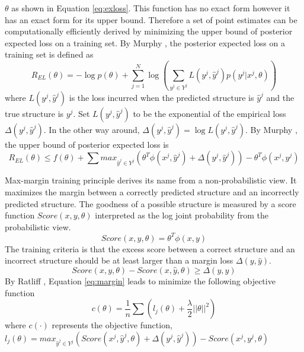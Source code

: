 $\theta$ as shown in Equation \ref{eq:exloss}. This function has no exact form however it has an exact form for its upper bound. Therefore a set of point estimates can be computationally efficiently derived by minimizing the upper bound of posterior expected loss on a training set. By Murphy \cite{murphy2012machine}, the posterior expected loss on a training set is defined as
\begin{equation}
\label{eq:exloss}
R_{EL}(\theta)=-\log p(\theta)+\sum_{j=1}^N \log(\sum_{y^j\in Y^j}L(y^j,\hat{y}^j)p(y^j|x^j,\theta))
\end{equation}
where $L(y^j,\hat{y}^j)$ is the loss incurred when the predicted structure is $\hat{y}^j$ and the true structure is $y^j$. Set $L(y^j,\hat{y}^j)$ to be the exponential of the empirical loss $\Delta(y^j,\hat{y}^j)$. In the other way around, $\Delta(y^j,\hat{y}^j)= \log L(y^j,\hat{y}^j)$.  By Murphy \cite{murphy2012machine}, the upper bound of posterior expected loss is 
\begin{equation}
\label{eq:upb}
R_{EL}(\theta)\leq  f(\theta)+\sum{max_{\hat{y}^j\in Y^j}(\theta^T\phi(x^j,\hat{y}^j)+\Delta(y^j,\hat{y}^j))-\theta^T\phi(x^j,y^j)}
\end{equation}

Max-margin training principle derives its name from a non-probabilistic view. It maximizes the margin between a correctly predicted structure and an incorrectly predicted structure. The goodness of a possible structure is measured by a score function $Score(x,y,\theta)$ interpreted as the log joint probability from the probabilistic view.
\begin{equation}
\label{eq:score}
Score(x,y,\theta)=\theta^T\phi(x,y)
\end{equation}
The training criteria is that the excess score between a correct structure and an incorrect structure should be at least larger than a margin loss $\Delta(y,\hat{y})$. 
\begin{equation}
\label{eq:margin}
Score(x,y,\theta)-Score(x,\hat{y},\theta)\geq\Delta(y,\hat{y})
\end{equation}
By Ratliff \cite{mmsc}, Equation \ref{eq:margin} leads to minimize the following objective function
\begin{equation}
\label{eq:cost}
c(\theta)=\frac{1}{n}\sum{(l_j(\theta)+\frac{\lambda}{2}||\theta||^2)}
\end{equation}
where $c(\cdot)$ represents the objective function, $l_j(\theta)=max_{\hat{y}^j\in Y^j}(Score(x^j,\hat{y}^j,\theta)+\Delta(y^j,\hat{y}^j))-Score(x^j,y^j,\theta)$

